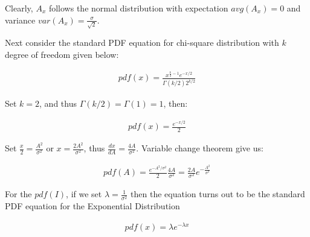 Clearly, $A_x$ follows the normal distribution with expectation $avg(A_x)=0$ and variance $var(A_x)=\frac{\sigma}{\sqrt{2}}$.

Next consider the standard PDF equation for chi-square distribution with $k$ degree of freedom given below:

\begin{align}
pdf(x) = \frac{x^{\frac{k}{2}-1}e^{-x/2}}{\Gamma(k/2)2^{k/2}}
\end{align}

Set $k=2$, and thus $\Gamma(k/2)=\Gamma(1)=1$, then:

\begin{align}
pdf(x) = \frac{e^{-x/2}}{2} 
\end{align}

Set $\frac{x}{2} = \frac{A^2}{\sigma^2}$ or $x = \frac{2A^2}{\sigma^2}$, thus $\frac{dx}{dA} = \frac{4A}{\sigma^2}$.
Variable change theorem give us:

\begin{align}
pdf(A) = \frac{e^{-A^2/\sigma^2}}{2} \frac{4A}{\sigma^2} = \frac{2A}{\sigma^2} e^{-\frac{A^2}{\sigma^2}}
\end{align}


For the $pdf(I)$, if we set $\lambda = \frac{1}{\sigma^2}$ then the equation turns out to be the standard PDF equation for the Exponential Distribution 

\begin{align}
pdf(x) = \lambda e^{- \lambda x}
\end{align}

